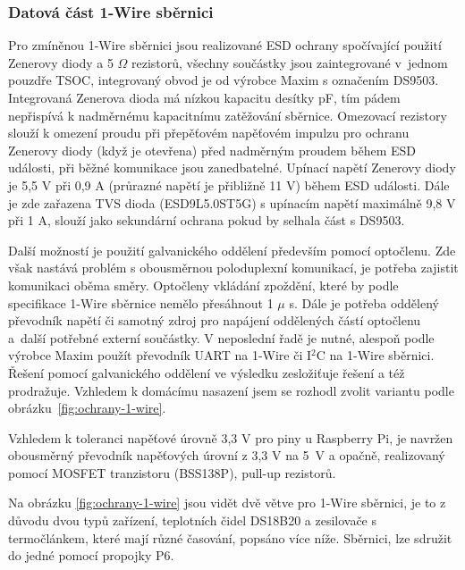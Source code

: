 \subsubsection{Datová část 1-Wire sběrnici}
\label{sec:datova-cast-1-wire-sbernice}
Pro zmíněnou 1-Wire sběrnici jsou realizované ESD ochrany spočívající použití Zenerovy diody a  5 $\Omega$ rezistorů, všechny součástky jsou zaintegrované v~jednom pouzdře TSOC, integrovaný obvod je od výrobce Maxim s označením DS9503. Integrovaná Zenerova dioda má nízkou kapacitu desítky pF, tím pádem nepřispívá k nadměrnému kapacitnímu zatěžování sběrnice. Omezovací rezistory slouží k omezení proudu při přepěťovém napěťovém impulzu pro ochranu Zenerovy diody (když je otevřena) před nadměrným proudem během ESD události, při běžné komunikace jsou zanedbatelné. Upínací napětí Zenerovy diody je 5,5 V při 0,9 A (průrazné napětí je přibližně 11 V) během ESD události. Dále je zde zařazena TVS dioda (ESD9L5.0ST5G) s upínacím napětí maximálně 9,8 V při 1 A, slouží jako sekundární ochrana pokud by selhala část s DS9503. 

Další možností je použití galvanického oddělení především pomocí optočlenu. Zde však nastává problém s obousměrnou poloduplexní komunikací, je potřeba zajistit komunikaci oběma směry. Optočleny vkládání zpoždění, které by podle specifikace 1-Wire sběrnice nemělo přesáhnout 1 $\mu$ s. Dále je potřeba oddělený převodník napětí či samotný zdroj pro napájení oddělených částí optočlenu a~další potřebné externí součástky. V neposlední řadě je nutné, alespoň podle výrobce Maxim použít převodník UART na 1-Wire či I$^2$C na 1-Wire sběrnici. Řešení pomocí galvanického oddělení ve výsledku zesložiťuje řešení a též prodražuje. Vzhledem k domácímu nasazení jsem se rozhodl zvolit variantu podle obrázku~\ref{fig:ochrany-1-wire}.

Vzhledem k toleranci napěťové úrovně 3,3 V pro piny u Raspberry Pi, je navržen obousměrný převodník napěťových úrovní z 3,3 V na 5~V a opačně, realizovaný pomocí MOSFET tranzistoru (BSS138P), pull-up rezistorů.

Na obrázku \ref{fig:ochrany-1-wire} jsou vidět dvě větve pro 1-Wire sběrnici, je to z důvodu dvou typů zařízení, teplotních čidel DS18B20 a  zesilovače s termočlánkem, které mají různé časování, popsáno více níže. Sběrnici, lze sdružit do jedné pomocí propojky P6.

